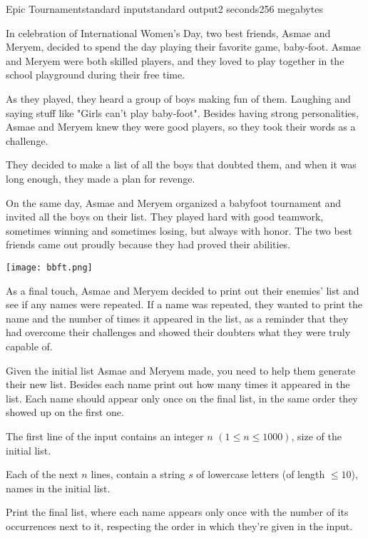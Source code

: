 \begin{problem}{Epic Tournament}{standard input}{standard output}{2 seconds}{256 megabytes}

In celebration of International Women's Day, two best friends, Asmae and Meryem, decided to spend the day playing their favorite game, baby-foot. Asmae and Meryem were both skilled players, and they loved to play together in the school playground during their free time.

As they played, they heard a group of boys making fun of them. Laughing and saying stuff like "Girls can't play baby-foot". Besides having strong personalities, Asmae and Meryem knew they were good players, so they took their words as a challenge.

They decided to make a list of all the boys that doubted them, and when it was long enough, they made a plan for revenge.

On the same day, Asmae and Meryem organized a babyfoot tournament and invited all the boys on their list. They played hard with good teamwork, sometimes winning and sometimes losing, but always with honor. The two best friends came out proudly because they had proved their abilities.

\begin{center}
\texttt{[image: bbft.png]}
\end{center}

As a final touch, Asmae and Meryem decided to print out their enemies' list and see if any names were repeated. If a name was repeated, they wanted to print the name and the number of times it appeared in the list, as a reminder that they had overcome their challenges and showed their doubters what they were truly capable of.

Given the initial list Asmae and Meryem made, you need to help them generate their new list. Besides each name print out how many times it appeared in the list. Each name should appear only once on the final list, in the same order they showed up on the first one.



\InputFile
The first line of the input contains an integer $n$ $(1 \leq n \leq 1000)$, size of the initial list.

Each of the next $n$ lines, contain a string $s$ of lowercase letters (of length $\leq 10$), names in the initial list.

\OutputFile
Print the final list, where each name appears only once with the number of its occurrences next to it, respecting the order in which they're given in the input.

\Example

\begin{example}
%
\end{example}

\end{problem}

